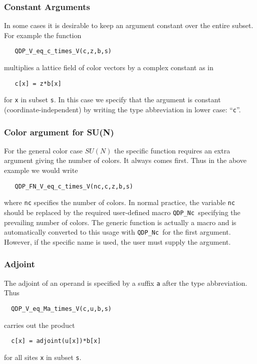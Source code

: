 \documentclass{article}
\newcommand{\namespace}{QDP}
\newcommand{\ttdash}{{\tt \_}}
\newcommand{\qdpNcMacro}{{\tt \namespace}\ttdash{\tt Nc }}
\begin{document}
\subsubsection{Constant Arguments}

In some cases it is desirable to keep an argument constant over the
entire subset.  For example the function
%
\begin{verbatim}
   QDP_V_eq_c_times_V(c,z,b,s)
\end{verbatim}
%
multiplies a lattice field of color vectors by a complex constant as in
%
\begin{verbatim}
   c[x] = z*b[x]
\end{verbatim}
%
for {\tt x} in subset {\tt s}.  In this case we specify that the argument is
constant (coordinate-independent) by writing the type abbreviation in lower
case: ``{\tt c}''.

\subsubsection{Color argument for SU(N)}

For the general color case $SU(N)$ the specific function requires an
extra argument giving the number of colors.  It always comes first.
Thus in the above example we would write
%
\begin{verbatim}
   QDP_FN_V_eq_c_times_V(nc,c,z,b,s)
\end{verbatim}
%
where {\tt nc} specifies the number of colors.  In normal practice,
the variable {\tt nc} should be replaced by the required user-defined
macro \qdpNcMacro specifying the prevailing number of colors.  The
generic function is actually a macro and is automatically converted to
this usage with \qdpNcMacro for the first argument.  However, if the
specific name is used, the user must supply the argument.

\subsubsection{Adjoint}

The adjoint of an operand is specified by a suffix {\tt a} after the
type abbreviation.  Thus
%
\begin{verbatim}
  QDP_V_eq_Ma_times_V(c,u,b,s)
\end{verbatim}
%
carries out the product
%
\begin{verbatim}
  c[x] = adjoint(u[x])*b[x]
\end{verbatim}
%
for all sites {\tt x} in subset {\tt s}.
\end{document}
